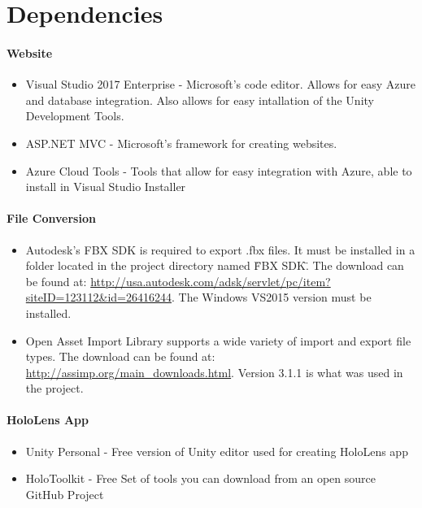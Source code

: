 \section{Dependencies}
\paragraph{Website}
\begin{itemize}
    \item Visual Studio 2017 Enterprise - Microsoft's code editor. Allows for easy Azure and database
    integration. Also allows for easy intallation of the Unity Development Tools.
    \item ASP.NET MVC - Microsoft's framework for creating websites.
    \item Azure Cloud Tools - Tools that allow for easy integration with Azure, able to install in Visual Studio Installer
\end{itemize}

\paragraph{File Conversion}
\begin{itemize}
    \item Autodesk's FBX SDK is required to export .fbx files.  It must be installed in a folder located in the project directory named \"FBX SDK\".  The download can be found at: 
    \url{http://usa.autodesk.com/adsk/servlet/pc/item?siteID=123112&id=26416244}.
    The Windows VS2015 version must be installed.

    \item Open Asset Import Library supports a wide variety of import and export file types.  The download can be found at: \url{http://assimp.org/main_downloads.html}.  Version 3.1.1 is what was used in the project.         
\end{itemize}

\paragraph{HoloLens App}
\begin{itemize}
    \item Unity Personal - Free version of Unity editor used for creating HoloLens app

    \item HoloToolkit - Free Set of tools you can download from an open source GitHub Project
\end{itemize}

